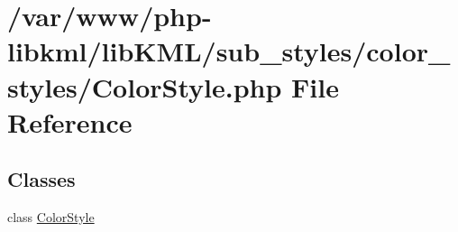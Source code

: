\hypertarget{ColorStyle_8php}{
\section{/var/www/php-\/libkml/libKML/sub\_\-styles/color\_\-styles/ColorStyle.php File Reference}
\label{de/df6/ColorStyle_8php}
}
\subsection*{Classes}
\begin{DoxyCompactItemize}
\item 
class \hyperlink{classColorStyle}{ColorStyle}
\end{DoxyCompactItemize}

